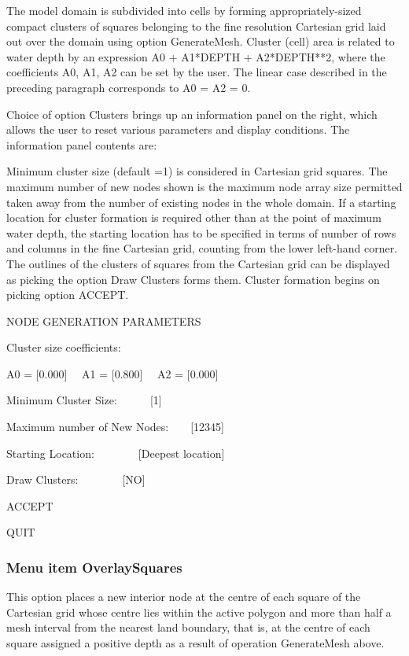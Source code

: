 \documentclass{article}
\begin{document}
The model domain is subdivided into cells by forming appropriately-sized compact clusters of squares belonging to the fine resolution Cartesian grid laid out over the domain using option GenerateMesh. Cluster (cell) area is related to water depth by an expression A0 + A1*DEPTH + A2*DEPTH**2, where the coefficients A0, A1, A2 can be set by the user. The linear case described in the preceding paragraph corresponds to A0 = A2 = 0.

Choice of option Clusters brings up an information panel on the right, which allows the user to reset various parameters and display conditions. The information panel contents are:

Minimum cluster size (default =1) is considered in Cartesian grid squares. The maximum number of new nodes shown is the maximum node array size permitted taken away from the number of existing nodes in the whole domain. If a starting location for cluster formation is required other than at the point of maximum water depth, the starting location has to be specified in terms of number of rows and columns in the fine Cartesian grid, counting from the lower left-hand corner. The outlines of the clusters of squares from the Cartesian grid can be displayed as picking the option Draw Clusters forms them. Cluster formation begins on picking option ACCEPT.

\begin{center}

NODE GENERATION PARAMETERS

Cluster size coefficients:

A0 = [0.000]\newline
\ \ A1 = [0.800]\newline
\ \ A2 = [0.000]

Minimum Cluster Size:\ \ \ \ \ \ [1]

Maximum number of New Nodes:\ \ \ \ [12345]

Starting Location:\ \ \ \ \ \ \ \ [Deepest location]

Draw Clusters:\ \ \ \ \ \ \ \ [NO]

ACCEPT

QUIT

\end{center}
\subsubsection[Menu item OverlaySquares]{Menu item OverlaySquares}
This option places a new interior node at the centre of each square of the Cartesian grid whose centre lies within the active polygon and more than half a mesh interval from the nearest land boundary, that is, at the centre of each square assigned a positive depth as a result of operation GenerateMesh above.
\end{document}
